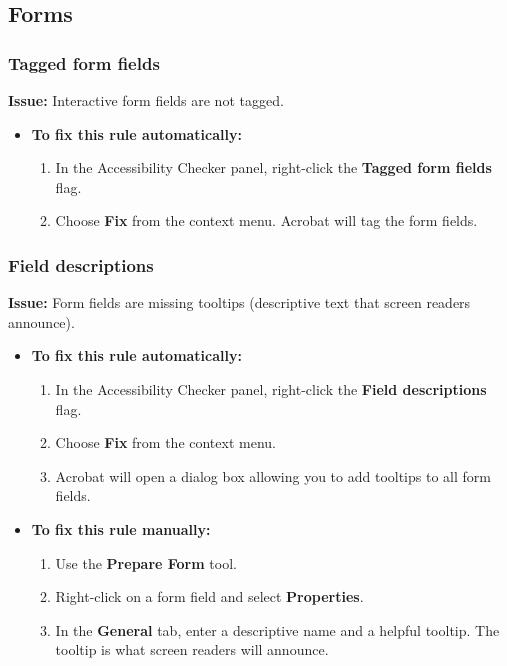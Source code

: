 \subsection{Forms}
\label{subsec:pdf-forms}

\subsubsection{Tagged form fields}
\label{ssubsec:pdf-tagged-form-fields}

\textbf{Issue:} Interactive form fields are not tagged.

\begin{itemize}
	\item \textbf{To fix this rule automatically:}
	      \begin{enumerate}
		      \item In the Accessibility Checker panel, right-click the \textbf{Tagged form fields} flag.
		      \item Choose \textbf{Fix} from the context menu. Acrobat will tag the form fields.
	      \end{enumerate}
\end{itemize}

\subsubsection{Field descriptions}
\label{ssubsec:pdf-field-descriptions}

\textbf{Issue:} Form fields are missing tooltips (descriptive text that screen readers announce).

\begin{itemize}
	\item \textbf{To fix this rule automatically:}
	      \begin{enumerate}
		      \item In the Accessibility Checker panel, right-click the \textbf{Field descriptions} flag.
		      \item Choose \textbf{Fix} from the context menu.
		      \item Acrobat will open a dialog box allowing you to add tooltips to all form fields.
	      \end{enumerate}
	\item \textbf{To fix this rule manually:}
	      \begin{enumerate}
		      \item Use the \textbf{Prepare Form} tool.
		      \item Right-click on a form field and select \textbf{Properties}.
		      \item In the \textbf{General} tab, enter a descriptive name and a helpful tooltip. The tooltip is what screen readers will announce.
	      \end{enumerate}
\end{itemize}

